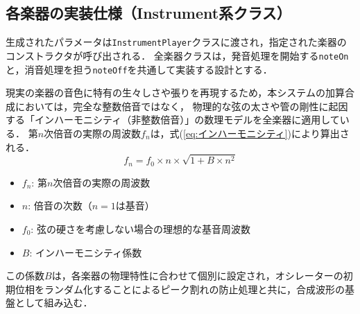 \documentclass[lualatex,book,paper=a4paper,jafontsize=11.5pt,jafontscale=1.05]{jlreq}
\begin{document}
\subsection{各楽器の実装仕様（Instrument系クラス）}

生成されたパラメータは\texttt{InstrumentPlayer}クラスに渡され，指定された楽器のコンストラクタが呼び出される．
全楽器クラスは，発音処理を開始する\texttt{noteOn}と，消音処理を担う\texttt{noteOff}を共通して実装する設計とする．

現実の楽器の音色に特有の生々しさや張りを再現するため，本システムの加算合成においては，完全な整数倍音ではなく，
物理的な弦の太さや管の剛性に起因する「インハーモニシティ（非整数倍音）」の数理モデルを全楽器に適用している\cite{インハーモニシティ式}．
第$n$次倍音の実際の周波数$f_n$は，式(\ref{eq:インハーモニシティ})により算出される．
\begin{equation}
    f_n = f_0 \times n \times \sqrt{1 + B \times n^2} \label{eq:インハーモニシティ}
\end{equation}
\begin{itemize}
    \item $f_n$: 第$n$次倍音の実際の周波数
    \item $n$: 倍音の次数（$n=1$は基音）
    \item $f_0$: 弦の硬さを考慮しない場合の理想的な基音周波数
    \item $B$: インハーモニシティ係数
\end{itemize}
この係数$B$は，各楽器の物理特性に合わせて個別に設定され，オシレーターの初期位相をランダム化することによるピーク割れの防止処理と共に，合成波形の基盤として組み込む．
\end{document}
